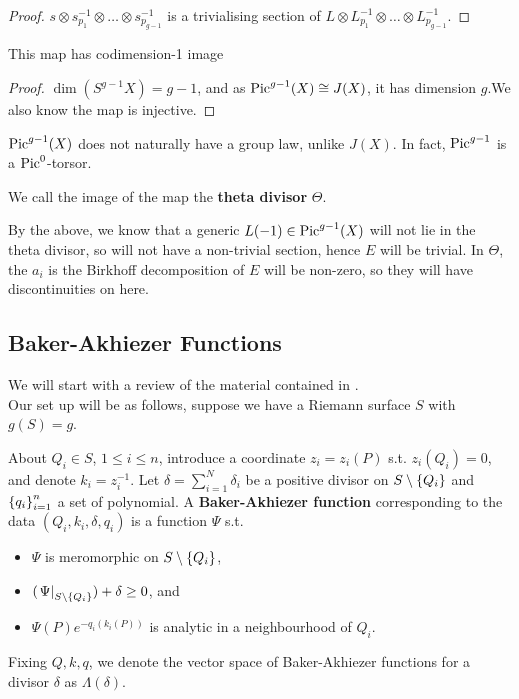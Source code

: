 \documentclass{article}
\begin{document}
\begin{proof}
	$s \otimes s_{p_1}^{-1} \otimes \dots \otimes s_{p_{g-1}}^{-1}$ is a trivialising section of $L \otimes L_{p_1}^{-1} \otimes \dots \otimes L_{p_{g-1}}^{-1}$. 
\end{proof}
\begin{prop}
	This map has codimension-1 image
\end{prop}
\begin{proof}
	$\dim (S^{g-1}X)=g-1$, and as $\operatorname{Pic}^{g-1}(X) \cong J(X)$, it has dimension $g$.We also know the map is injective. 
\end{proof}
\begin{remark}
	$\operatorname{Pic}^{g-1}(X)$ does not naturally have a group law, unlike $J(X)$. In fact, $\operatorname{Pic}^{g-1}$ is a $\operatorname{Pic}^0$-torsor. 
\end{remark}
\begin{definition}
	We call the image of the map the \textbf{theta divisor} $\Theta$. 
\end{definition}
By the above, we know that a generic $L(-1)\in \operatorname{Pic}^{g-1}(X)$ will not lie in the theta divisor, so will not have a non-trivial section, hence $E$ will be trivial. In $\Theta$, the $a_i$ is the Birkhoff decomposition of $E$ will be non-zero, so they will have discontinuities on here. 

\subsection{Baker-Akhiezer Functions}
We will start with a review of the material contained in \cite{Dubrovin2009, Dubrovin1985}. \\
Our set up will be as follows, suppose we have a Riemann surface $S$ with $g(S)=g$. 
\begin{definition}
	About $Q_i \in S$, $1 \leq i \leq n$, introduce a coordinate $z_i=z_i(P)$ s.t. $z_i(Q_i)=0$, and denote $k_i=z_i^{-1}$. Let $\delta = \sum_{i=1}^{N} \delta_i $ be a positive divisor on $S\setminus \left\{ Q_i \right\}$ and $\left\{ q_i \right\}_{i=1}^n$ a set of  polynomial. A \textbf{Baker-Akhiezer function} corresponding to the data $(Q_i,k_i,\delta,q_i)$ is a function $\Psi$ s.t. 
	\begin{itemize}
		\item $\Psi$ is meromorphic on $S \setminus \left\{ Q_i \right\}$, 
		\item $(\left. \Psi \right\rvert_{S\setminus \left\{ Q_i \right\}})+\delta \geq 0$, and 
		\item $\Psi(P)e^{-q_i(k_i(P))}$ is analytic in a neighbourhood of $Q_i$. 
	\end{itemize}
	Fixing $Q,k,q$, we denote the vector space of Baker-Akhiezer functions for a divisor $\delta$ as $\Lambda(\delta)$. 
\end{definition}
\end{document}
